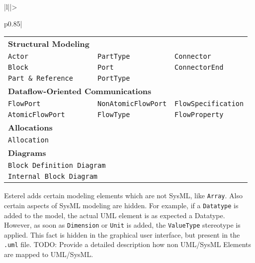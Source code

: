 \documentclass{template/openetcs_article}
\begin{document}
\begin{longtable}{|l||>{\raggedright}p{0.85\linewidth}|}
\begin{tabular}{l l l}
                            \textbf{Structural Modeling}                                                          \\
                            \texttt{Actor}              & \texttt{PartType}          & \texttt{Connector}         \\
                            \texttt{Block}              & \texttt{Port}              & \texttt{ConnectorEnd}      \\
                            \texttt{Part \& Reference}  & \texttt{PortType}                                       \\
                            \multicolumn{3}{l}{\textbf{Dataflow-Oriented Communications}}                         \\
                            \texttt{FlowPort}           & \texttt{NonAtomicFlowPort} & \texttt{FlowSpecification} \\
                            \texttt{AtomicFlowPort}     & \texttt{FlowType}          & \texttt{FlowProperty}      \\
                            \textbf{Allocations}                                                                  \\
                            \texttt{Allocation}                                                                   \\
                            \textbf{Diagrams}                                                                     \\
                            \multicolumn{3}{l}{\texttt{Block Definition Diagram}}                                 \\
                            \multicolumn{3}{l}{\texttt{Internal Block Diagram}}                                   \\
                          \end{tabular} 
                          \vspace
                          Esterel adds certain modeling elements which are not SysML, like \texttt{Array}. Also certain aspects
                          of SysML modeling are hidden. For example, if a \texttt{Datatype} is added to the model, the actual 
                          UML element is as expected a Datatype. However, as soon as \texttt{Dimension} or \texttt{Unit} 
                          is added, the \texttt{ValueType} stereotype is applied. This fact is hidden in the graphical user
                          interface, but present in the \texttt{.uml} file.
                          TODO: Provide a detailed description how non UML/SysML Elements are mapped to UML/SysML.
                          \tabularnewline \hline
\end{longtable}
\end{document}
